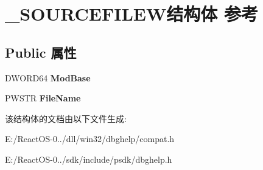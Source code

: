 \hypertarget{struct___s_o_u_r_c_e_f_i_l_e_w}{}\section{\+\_\+\+S\+O\+U\+R\+C\+E\+F\+I\+L\+E\+W结构体 参考}
\label{struct___s_o_u_r_c_e_f_i_l_e_w}
\subsection*{Public 属性}
\begin{DoxyCompactItemize}
\item 
\mbox{\label{struct___s_o_u_r_c_e_f_i_l_e_w_af76a27575ed864df266abe5881d8e18e}} 
D\+W\+O\+R\+D64 {\bfseries Mod\+Base}
\item 
\mbox{\label{struct___s_o_u_r_c_e_f_i_l_e_w_ad8de3ba9652fdf78319e0e4ebb547fc8}} 
P\+W\+S\+TR {\bfseries File\+Name}
\end{DoxyCompactItemize}


该结构体的文档由以下文件生成\+:\begin{DoxyCompactItemize}
\item 
E\+:/\+React\+O\+S-\/0../dll/win32/dbghelp/compat.\+h\item 
E\+:/\+React\+O\+S-\/0../sdk/include/psdk/dbghelp.\+h\end{DoxyCompactItemize}
